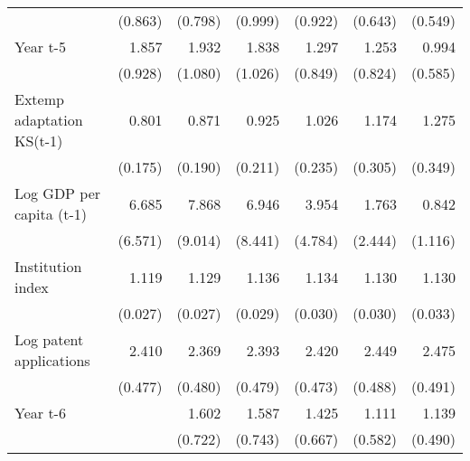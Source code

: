 \begin{table}[htbp]
\begin{tabular}{l*{6}{D{.}{.}{-1}}}
                    &     (0.863)         &     (0.798)         &     (0.999)         &     (0.922)         &     (0.643)         &     (0.549)         \\
\addlinespace
Year t-5            &       1.857         &       1.932         &       1.838         &       1.297         &       1.253         &       0.994         \\
                    &     (0.928)         &     (1.080)         &     (1.026)         &     (0.849)         &     (0.824)         &     (0.585)         \\
\addlinespace
Extemp adaptation KS(t-1)&       0.801         &       0.871         &       0.925         &       1.026         &       1.174         &       1.275         \\
                    &     (0.175)         &     (0.190)         &     (0.211)         &     (0.235)         &     (0.305)         &     (0.349)         \\
\addlinespace
Log GDP per capita (t-1)&       6.685\sym{*}  &       7.868\sym{*}  &       6.946\sym{\%}  &       3.954         &       1.763         &       0.842         \\
                    &     (6.571)         &     (9.014)         &     (8.441)         &     (4.784)         &     (2.444)         &     (1.116)         \\
\addlinespace
Institution index   &       1.119\sym{***}&       1.129\sym{***}&       1.136\sym{***}&       1.134\sym{***}&       1.130\sym{***}&       1.130\sym{***}\\
                    &     (0.027)         &     (0.027)         &     (0.029)         &     (0.030)         &     (0.030)         &     (0.033)         \\
\addlinespace
Log patent applications&       2.410\sym{***}&       2.369\sym{***}&       2.393\sym{***}&       2.420\sym{***}&       2.449\sym{***}&       2.475\sym{***}\\
                    &     (0.477)         &     (0.480)         &     (0.479)         &     (0.473)         &     (0.488)         &     (0.491)         \\
\addlinespace
Year t-6            &                     &       1.602         &       1.587         &       1.425         &       1.111         &       1.139         \\
                    &                     &     (0.722)         &     (0.743)         &     (0.667)         &     (0.582)         &     (0.490)         \\

\end{tabular}
\end{table}
